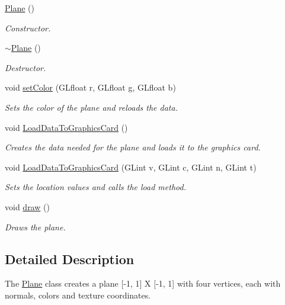 \begin{DoxyCompactItemize}
\item 
\hyperlink{class_plane_acac0d9c003e0ab10d07b146c3566a0c7}{Plane} ()
\begin{DoxyCompactList}\small\item\em Constructor. \end{DoxyCompactList}\item 
\hyperlink{class_plane_a69abd86051c880dcb44b249ad10c4436}{$\sim$\+Plane} ()
\begin{DoxyCompactList}\small\item\em Destructor. \end{DoxyCompactList}\item 
void \hyperlink{class_plane_adff21e131a858c4c53139caea43a7a0b}{set\+Color} (G\+Lfloat r, G\+Lfloat g, G\+Lfloat b)
\begin{DoxyCompactList}\small\item\em Sets the color of the plane and reloads the data. \end{DoxyCompactList}\item 
\mbox{\label{class_plane_a04089a843f5f028b75de4cb118c9dbbf}} 
void \hyperlink{class_plane_a04089a843f5f028b75de4cb118c9dbbf}{Load\+Data\+To\+Graphics\+Card} ()
\begin{DoxyCompactList}\small\item\em Creates the data needed for the plane and loads it to the graphics card. \end{DoxyCompactList}\item 
void \hyperlink{class_plane_a2a1cfed2e4f521aaa66082c8d9dc7ad4}{Load\+Data\+To\+Graphics\+Card} (G\+Lint v, G\+Lint c, G\+Lint n, G\+Lint t)
\begin{DoxyCompactList}\small\item\em Sets the location values and calls the load method. \end{DoxyCompactList}\item 
\mbox{\label{class_plane_a8877358878e91929c4c01bad40cbdb78}} 
void \hyperlink{class_plane_a8877358878e91929c4c01bad40cbdb78}{draw} ()
\begin{DoxyCompactList}\small\item\em Draws the plane. \end{DoxyCompactList}\end{DoxyCompactItemize}


\subsection{Detailed Description}
The \hyperlink{class_plane}{Plane} class creates a plane \mbox{[}-\/1, 1\mbox{]} X \mbox{[}-\/1, 1\mbox{]} with four vertices, each with normals, colors and texture coordinates. 

